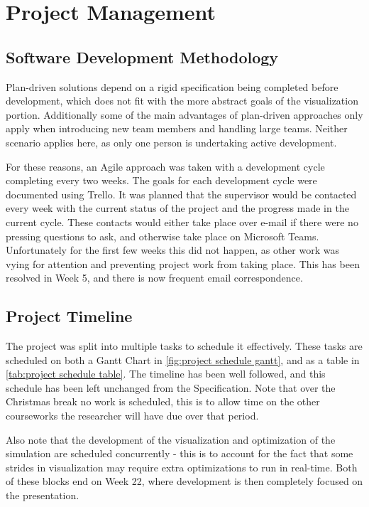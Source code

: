
\chapter{Project Management}
\label{sec:ProjectManagement}
\section{Software Development Methodology}
Plan-driven solutions depend on a rigid specification being completed before development\cite{modules:CS261}, which does not fit with the more abstract goals of the visualization portion.
Additionally some of the main advantages of plan-driven approaches only apply when introducing new team members and handling large teams.
Neither scenario applies here, as only one person is undertaking active development.

For these reasons, an Agile approach was taken with a development cycle completing every two weeks.
The goals for each development cycle were documented using Trello\cite{tool:Trello}.
It was planned that the supervisor would be contacted every week with the current status of the project and the progress made in the current cycle.
These contacts would either take place over e-mail if there were no pressing questions to ask, and otherwise take place on Microsoft Teams\cite{tool:MicrosoftTeams}.
Unfortunately for the first few weeks this did not happen, as other work was vying for attention and preventing project work from taking place.
This has been resolved in Week 5, and there is now frequent email correspondence.

\section{Project Timeline}
The project was split into multiple tasks to schedule it effectively.
These tasks are scheduled on both a Gantt Chart in \cref{fig:project schedule gantt}, and as a table in \cref{tab:project schedule table}.
The timeline has been well followed, and this schedule has been left unchanged from the Specification. 
Note that over the Christmas break no work is scheduled, this is to allow time on the other courseworks the researcher will have due over that period.

Also note that the development of the visualization and optimization of the simulation are scheduled concurrently - this is to account for the fact that some strides in visualization may require extra optimizations to run in real-time.
Both of these blocks end on Week 22, where development is then completely focused on the presentation.

